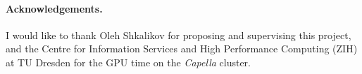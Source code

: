 \documentclass[runningheads]{llncs}
\begin{document}
\paragraph{Acknowledgements.}
I would like to thank Oleh Shkalikov for proposing and supervising this project, and the
Centre for Information Services and High Performance Computing (ZIH) at TU Dresden for the GPU
time on the \emph{Capella} cluster.



\end{document}
